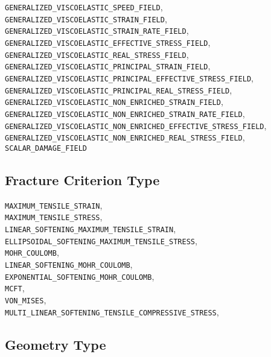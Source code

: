 \documentclass[10pt]{article}
\begin{document}
    \verb+GENERALIZED_VISCOELASTIC_SPEED_FIELD+,\\
    \verb+GENERALIZED_VISCOELASTIC_STRAIN_FIELD+,\\
    \verb+GENERALIZED_VISCOELASTIC_STRAIN_RATE_FIELD+,\\
    \verb+GENERALIZED_VISCOELASTIC_EFFECTIVE_STRESS_FIELD+,\\
    \verb+GENERALIZED_VISCOELASTIC_REAL_STRESS_FIELD+,\\
    \verb+GENERALIZED_VISCOELASTIC_PRINCIPAL_STRAIN_FIELD+,\\
    \verb+GENERALIZED_VISCOELASTIC_PRINCIPAL_EFFECTIVE_STRESS_FIELD+,\\
    \verb+GENERALIZED_VISCOELASTIC_PRINCIPAL_REAL_STRESS_FIELD+,\\
    \verb+GENERALIZED_VISCOELASTIC_NON_ENRICHED_STRAIN_FIELD+,\\
    \verb+GENERALIZED_VISCOELASTIC_NON_ENRICHED_STRAIN_RATE_FIELD+,\\
    \verb+GENERALIZED_VISCOELASTIC_NON_ENRICHED_EFFECTIVE_STRESS_FIELD+,\\
    \verb+GENERALIZED_VISCOELASTIC_NON_ENRICHED_REAL_STRESS_FIELD+,\\
    \verb+SCALAR_DAMAGE_FIELD+

\subsection{Fracture Criterion Type}

\verb+MAXIMUM_TENSILE_STRAIN+,\\
\verb+MAXIMUM_TENSILE_STRESS+,\\
\verb+LINEAR_SOFTENING_MAXIMUM_TENSILE_STRAIN+,\\
\verb+ELLIPSOIDAL_SOFTENING_MAXIMUM_TENSILE_STRESS+,\\
\verb+MOHR_COULOMB+,\\
\verb+LINEAR_SOFTENING_MOHR_COULOMB+,\\
\verb+EXPONENTIAL_SOFTENING_MOHR_COULOMB+,\\
\verb+MCFT+,\\
\verb+VON_MISES+,\\
\verb+MULTI_LINEAR_SOFTENING_TENSILE_COMPRESSIVE_STRESS+,


\subsection{Geometry Type}
\end{document}
